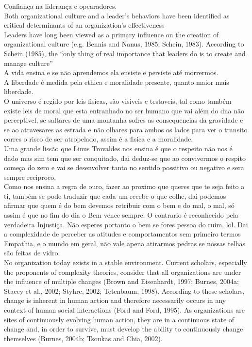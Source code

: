 Confiança na liderança e opearadores.\\
Both organizational culture and a leader’s behaviors have been identified as critical
determinants of an organization’s effectiveness\\
Leaders have long been viewed as a primary influence on the creation of organizational
culture (e.g. Bennis and Nanus, 1985; Schein, 1983). According to Schein (1985), the “only
thing of real importance that leaders do is to create and manage culture”\\


A vida ensina e se não aprendemos ela ensiste e persiste até morrermos.\\

A liberdade é medida pela ethica e moralidade presente, quanto maior mais liberdade.\\


O universo é regido por leis fisicas, são visiveis e testaveis, tal como também existe leis de moral que esta entranhado no ser humano que vai além do dna não perceptivel, se saltares de uma montanha sofres as consequencias da gravidade e se ao atravesares as estrada e não olhares para ambos os lados para ver o transito corres o risco de ser atropelado, assim é a fisica e a moralidade.\\

Uma grande lissão que Linus Trovaldes nos ensina é que o respeito não nos é dado mas sim tem que ser conquitado, dai deduz-se que ao convivermos o respito começa do zero e vai se desenvolver tanto no sentido possitivo ou negativo e sera sempre reciproco.\\

Como nos ensina a regra de ouro, fazer ao proximo que queres que te seja feito a ti, também se pode traduzir que cada um recebe o que colhe, dai podemos afirmar que quem é do bem devemos retribuir com o bem e do mal, o mal, só assim é que no fim do dia o Bem vence sempre. O contrario é reconhecido pela verdadeira Injustiça.
Não esperes portanto o bem se fores pessoa do ruim, lol. Dai a complexidade de perceber as atitudes e comportamentos sem primeiro termos Empathia, e o mundo em geral, não vale apena atirarmos pedras se nossas telhas são feitas de vidro.\\
No organization today exists in a stable environment. Current scholars, especially the
proponents of complexity theories, consider that all organizations are under the influence
of multiple changes (Brown and Eisenhardt, 1997; Burnes, 2004a; Stacey et al., 2002;
Styhre, 2002; Tetenbaum, 1998). According to these scholars, change is inherent in
human action and therefore necessarily occurs in any context of human social interactions
(Ford and Ford, 1995). As organizations are sites of continuously evolving human action,
they are in a continuous state of change and, in order to survive, must develop the ability
to continuously change themselves (Burnes, 2004b; Tsoukas and Chia, 2002).\\

